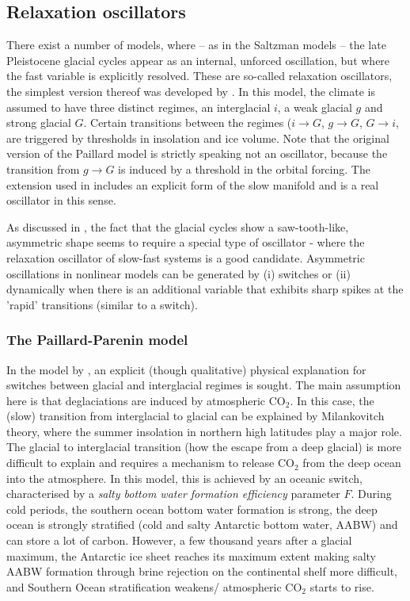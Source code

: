 \documentclass[12pt]{article}
\begin{document}
\newpage
\subsection{Relaxation oscillators}
There exist a number of models, where -- as in the Saltzman models -- the late Pleistocene glacial cycles appear as an internal, unforced oscillation, but where the fast variable is explicitly resolved. These are so-called relaxation oscillators, the simplest version thereof was developed by \cite{Paillard:1998bn}. 
In this model, the climate is assumed to have three distinct regimes, an interglacial $i$, a weak glacial $g$ and strong glacial $G$. Certain transitions between the regimes ($i\rightarrow G$, $g\rightarrow G$, $G\rightarrow i$, are triggered by thresholds in insolation and ice volume. Note that the original version of the Paillard model is strictly speaking not an oscillator, because the transition from $g\rightarrow G$ is induced by a threshold in the orbital forcing. The extension used in \cite{Ashwin2015} includes an explicit form of the slow manifold and is a real oscillator in this sense. 

As discussed in \cite{Omta:2013dl}, the fact that the glacial cycles show a saw-tooth-like, asymmetric shape seems to require a special type of oscillator - where the relaxation oscillator of slow-fast systems is a good candidate. Asymmetric oscillations in nonlinear models can be generated by (i) switches or (ii) dynamically when there is an additional variable that exhibits sharp spikes at the 'rapid' transitions (similar to a switch). 


\subsubsection{The Paillard-Parenin model}
In the model by \cite{Paillard:2004dn}, an explicit (though qualitative) physical explanation for switches between glacial and interglacial regimes is sought. The main assumption here is that deglaciations are induced by atmospheric CO$_2$. In this case, the (slow) transition from interglacial to glacial can be explained by Milankovitch theory, where the summer insolation in northern high latitudes play a major role. The glacial to interglacial transition (how the escape from a deep glacial) is more difficult to explain and requires a mechanism to release CO$_2$ from the deep ocean into the atmosphere. 
In this model, this is achieved by an oceanic switch, characterised by a {\it salty bottom water formation efficiency} parameter $F$. During cold periods, the southern ocean bottom water formation is strong, the deep ocean is strongly stratified (cold and salty Antarctic bottom water, AABW) and can store a lot of carbon. However, a few thousand years after a glacial maximum, the Antarctic ice sheet reaches its maximum extent making salty AABW formation through brine rejection on the continental shelf more difficult, and Southern Ocean stratification weakens/ atmospheric CO$_2$ starts to rise. 
\end{document}
